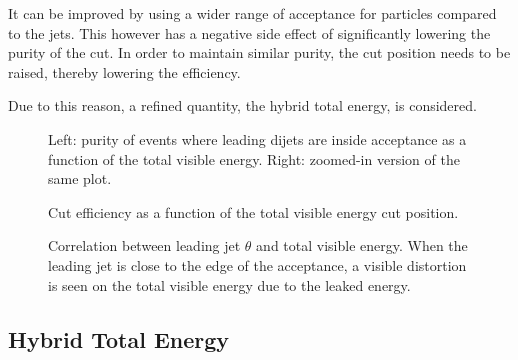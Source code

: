 It can be improved by using a wider range of acceptance for particles compared to the jets.  This however has a negative side effect of significantly lowering the purity of the cut.  In order to maintain similar purity, the cut position needs to be raised, thereby lowering the efficiency.

Due to this reason, a refined quantity, the hybrid total energy, is considered.



\begin{figure}[htp!]
    \centering
    \caption{Left: purity of events where leading dijets are inside acceptance as a function of the total visible energy.  Right: zoomed-in version of the same plot.}
    \label{Figure:LeadingJet-SumEFraction}
\end{figure}

\begin{figure}[htp!]
    \centering
    \caption{Cut efficiency as a function of the total visible energy cut position.}
    \label{Figure:LeadingJet-SumEEfficiency}
\end{figure}

\begin{figure}[htp!]
    \centering
    \caption{Correlation between leading jet $\theta$ and total visible energy.  When the leading jet is close to the edge of the acceptance, a visible distortion is seen on the total visible energy due to the leaked energy.}
    \label{Figure:LeadingJet-SumEJetTheta}
\end{figure}

\subsection{Hybrid Total Energy}

